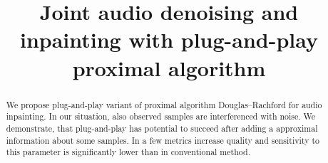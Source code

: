 \documentclass[conference]{IEEEtran}
\newcommand{\todo}[1]{\textcolor{red}{#1}}
\begin{document}

\title{Joint audio denoising and inpainting with plug-and-play proximal algorithm}

\author{
\and
{}
}

\maketitle

\begin{abstract}
We propose plug-and-play variant of proximal algorithm Douglas--Rachford for audio inpainting.
In our situation, also observed samples are interferenced with noise.
We demonstrate, that plug-and-play has potential to succeed after adding a approximal information about some samples.
In a few metrics increase quality and sensitivity to this parameter is significantly lower than in conventional method. 
\end{abstract}
\end{document}
